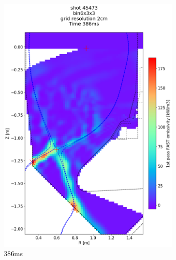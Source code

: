 \begin{figure}
     \centering
     \begin{subfigure}{0.355\linewidth}
         \centering
         \includegraphics[trim={75 70 25 190},clip,width=\textwidth]{Chapters/chapter2/figs/IRVB-MASTU_shot-45473_export_67.png}
         \vspace*{-6.5mm}
         \caption{386ms}
         \label{fig:45473_export2_1}
     \end{subfigure}
     \begin{subfigure}{0.355\linewidth}
         \centering

\end{subfigure}
\end{figure}
